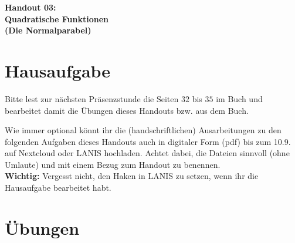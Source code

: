 \documentclass[a4paper,ngerman,12pt]{exam}
\begin{document}
\vspace*{0.3cm}
\begin{center}
  \huge\bfseries Handout 03:\\ Quadratische Funktionen\\ (Die Normalparabel)
\end{center}

\section*{Hausaufgabe}

\par Bitte lest zur nächsten Präsenzstunde die Seiten $32$ bis $35$ im Buch und bearbeitet damit die Übungen dieses Handouts bzw. aus dem Buch.

\par Wie immer optional könnt ihr die (handschriftlichen) Ausarbeitungen zu den folgenden Aufgaben dieses Handouts auch in digitaler Form (pdf) bis zum 10.9. auf Nextcloud oder LANIS hochladen. Achtet dabei, die Dateien sinnvoll (ohne Umlaute) und mit einem Bezug zum Handout zu benennen.\\ \textbf{Wichtig:} Vergesst nicht, den Haken in LANIS zu setzen, wenn ihr die Hausaufgabe bearbeitet habt.

\section*{Übungen}
\end{document}
